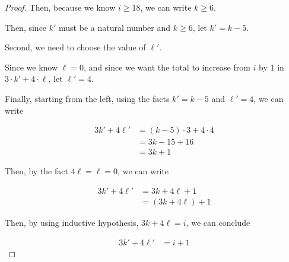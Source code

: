 \documentclass[12pt]{article}
\begin{document}
\begin{itemize}
\begin{proof}
    \bigskip

    Then, because we know $i \geq 18$, we can write $k \geq 6$.

    \bigskip

    Then, since $k'$ must be a natural number and $k \geq 6$, let $k' = k - 5$.

    \bigskip

    Second, we need to choose the value of $\ell'$.

    \bigskip

    Since we know $\ell = 0$, and since we want the total to increase from $i$ by 1
    in $3 \cdot k' + 4 \cdot \ell$, let $\ell' = 4$.

    \bigskip

    Finally, starting from the left, using the facts $k' = k - 5$ and $\ell' = 4$, we can write

    \begin{align}
    3k' + 4\ell' &= (k-5) \cdot 3 + 4 \cdot 4\\
    &= 3k - 15 + 16\\
    &= 3k + 1
    \end{align}

    \bigskip

    Then, by the fact $4\ell = \ell = 0$, we can write

    \begin{align}
    3k' + 4\ell' &= 3k + 4\ell + 1\\
    &= (3k + 4\ell) + 1
    \end{align}

    \bigskip

    Then, by using inductive hypothesis, $3k + 4\ell = i$, we can conclude

    \begin{align}
    3k' + 4\ell' &= i + 1
    \end{align}

    \end{proof}








\end{itemize}
\end{document}

